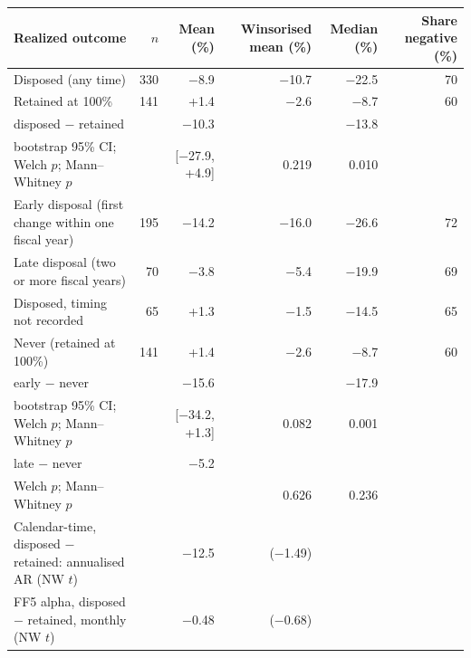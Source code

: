 \begin{tabular}{>{\raggedright\arraybackslash}p{5.3cm}rrrrr}
\toprule
Realized outcome & $n$ & Mean (\%) & Winsorised mean (\%) & Median (\%) & Share negative (\%) \\
\midrule
Disposed (any time) & 330 & $-$8.9 & $-$10.7 & $-$22.5 & 70 \\
Retained at 100\% & 141 & +1.4 & $-$2.6 & $-$8.7 & 60 \\
\quad disposed $-$ retained & & $-$10.3 & & $-$13.8 & \\
\quad bootstrap 95\% CI; Welch $p$; Mann--Whitney $p$ & & [$-$27.9, +4.9] & 0.219 & 0.010 & \\
\midrule
Early disposal (first change within one fiscal year) & 195 & $-$14.2 & $-$16.0 & $-$26.6 & 72 \\
Late disposal (two or more fiscal years) & 70 & $-$3.8 & $-$5.4 & $-$19.9 & 69 \\
Disposed, timing not recorded & 65 & +1.3 & $-$1.5 & $-$14.5 & 65 \\
Never (retained at 100\%) & 141 & +1.4 & $-$2.6 & $-$8.7 & 60 \\
\quad early $-$ never & & $-$15.6 & & $-$17.9 & \\
\quad bootstrap 95\% CI; Welch $p$; Mann--Whitney $p$ & & [$-$34.2, +1.3] & 0.082 & 0.001 & \\
\quad late $-$ never & & $-$5.2 & & & \\
\quad Welch $p$; Mann--Whitney $p$ & & & 0.626 & 0.236 & \\
\midrule
Calendar-time, disposed $-$ retained: annualised AR (NW $t$) & & $-$12.5 & ($-$1.49) & & \\
FF5 alpha, disposed $-$ retained, monthly (NW $t$) & & $-$0.48 & ($-$0.68) & & \\
\bottomrule
\end{tabular}
